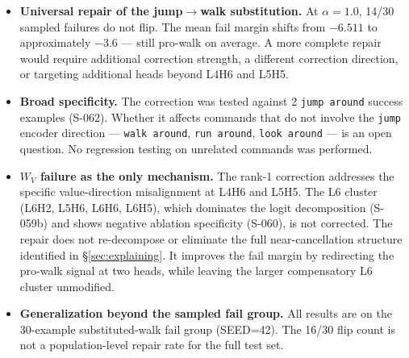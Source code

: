 \begin{itemize}
  \item \textbf{Universal repair of the jump$\to$walk substitution.}
    At $\alpha=1.0$, 14/30 sampled failures do not flip.
    The mean fail margin shifts from $-6.511$ to approximately $-3.6$ --- still
    pro-walk on average.
    A more complete repair would require additional correction strength, a different
    correction direction, or targeting additional heads beyond L4H6 and L5H5.

  \item \textbf{Broad specificity.}
    The correction was tested against 2 \texttt{jump around} success examples (S-062).
    Whether it affects commands that do not involve the \texttt{jump} encoder direction ---
    \texttt{walk around}, \texttt{run around}, \texttt{look around} --- is an open
    question.
    No regression testing on unrelated commands was performed.

  \item \textbf{$W_V$ failure as the only mechanism.}
    The rank-1 correction addresses the specific value-direction misalignment at L4H6
    and L5H5.
    The L6 cluster (L6H2, L5H6, L6H6, L6H5), which dominates the logit decomposition
    (S-059b) and shows negative ablation specificity (S-060), is not corrected.
    The repair does not re-decompose or eliminate the full near-cancellation structure
    identified in \S\ref{sec:explaining}.
    It improves the fail margin by redirecting the pro-walk signal at two heads, while
    leaving the larger compensatory L6 cluster unmodified.

  \item \textbf{Generalization beyond the sampled fail group.}
    All results are on the 30-example substituted-walk fail group (SEED=42).
    The 16/30 flip count is not a population-level repair rate for the full test set.
\end{itemize}

